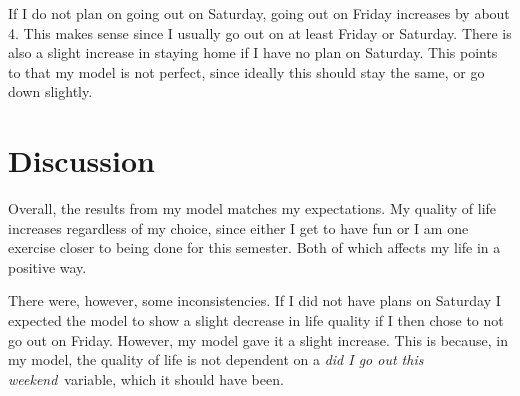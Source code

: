 \documentclass{article}
\begin{document}
    If I do not plan on going out on Saturday, going out on Friday increases
    by about 4. This makes sense since I usually go out on at least Friday or
    Saturday. There is also a slight increase in staying home if I have no plan
    on Saturday. This points to that my model is not perfect, since ideally
    this should stay the same, or go down slightly.

\section*{Discussion}
    Overall, the results from my model matches my expectations. My quality of
    life increases regardless of my choice, since either I get to have fun or I
    am one exercise closer to being done for this semester. Both of which
    affects my life in a positive way. 

    There were, however, some inconsistencies. If I did not have plans on
    Saturday I expected the model to show a slight decrease in life quality if
    I then chose to not go out on Friday. However, my model gave it a slight
    increase. This is because, in my model, the quality of life is not
    dependent on a \emph{did I go out this weekend} variable, which it should
    have been.




\end{document}
